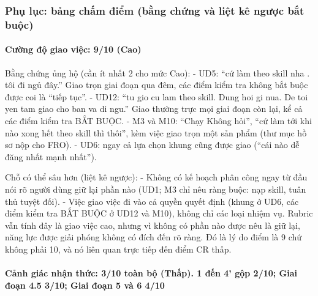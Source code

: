 \documentclass[12pt,a4paper]{article}
\begin{document}
\hypertarget{phux1ee5-lux1ee5c-bux1ea3ng-chux1ea5m-ux111iux1ec3m-bux1eb1ng-chux1ee9ng-vuxe0-liux1ec7t-kuxea-ngux1b0ux1ee3c-bux1eaft-buux1ed9c}{%
\subsubsection{Phụ lục: bảng chấm điểm (bằng chứng và liệt kê ngược bắt
buộc)}\label{phux1ee5-lux1ee5c-bux1ea3ng-chux1ea5m-ux111iux1ec3m-bux1eb1ng-chux1ee9ng-vuxe0-liux1ec7t-kuxea-ngux1b0ux1ee3c-bux1eaft-buux1ed9c}}

\hypertarget{cux1b0ux1eddng-ux111ux1ed9-giao-viux1ec7c-910-cao}{%
\paragraph{Cường độ giao việc: 9/10
(Cao)}\label{cux1b0ux1eddng-ux111ux1ed9-giao-viux1ec7c-910-cao}}

Bằng chứng ủng hộ (cần ít nhất 2 cho mức Cao): - UD5: ``cứ làm theo
skill nha . tôi đi ngủ đây.'' Giao trọn giai đoạn qua đêm, các điểm kiểm
tra không bắt buộc được coi là ``tiếp tục''. - UD12: ``tu gio cu lam
theo skill. Dung hoi gi nua. De toi yen tam giao cho ban va di ngu.''
Giao thường trực mọi giai đoạn còn lại, kể cả các điểm kiểm tra BẮT
BUỘC. - M3 và M10: ``Chạy Không hỏi'', ``cứ làm tới khi nào xong hết
theo skill thì thôi'', kèm việc giao trọn một sản phẩm (thư mục hồ sơ
nộp cho FRO). - UD6: ngay cả lựa chọn khung cũng được giao (``cái nào dễ
đăng nhất mạnh nhất'').

Chỗ có thể sâu hơn (liệt kê ngược): - Không có kế hoạch phân công ngay
từ đầu nói rõ người dùng giữ lại phần nào (UD1; M3 chỉ nêu ràng buộc:
nạp skill, tuân thủ tuyệt đối). - Việc giao việc đi vào cả quyền quyết
định (khung ở UD6, các điểm kiểm tra BẮT BUỘC ở UD12 và M10), không chỉ
các loại nhiệm vụ. Rubric vẫn tính đây là giao việc cao, nhưng vì không
có phần nào được nêu là giữ lại, năng lực được giải phóng không có đích
đến rõ ràng. Đó là lý do điểm là 9 chứ không phải 10, và nó liên quan
trực tiếp đến điểm CR thấp.

\hypertarget{cux1ea3nh-giuxe1c-nhux1eadn-thux1ee9c-310-touxe0n-bux1ed9-thux1ea5p.-1-ux111ux1ebfn-4-gux1ed9p-210-giai-ux111oux1ea1n-4.5-310-giai-ux111oux1ea1n-5-vuxe0-6-410}{%
\paragraph{Cảnh giác nhận thức: 3/10 toàn bộ (Thấp). 1 đến 4' gộp 2/10;
Giai đoạn 4.5 3/10; Giai đoạn 5 và 6
4/10}\label{cux1ea3nh-giuxe1c-nhux1eadn-thux1ee9c-310-touxe0n-bux1ed9-thux1ea5p.-1-ux111ux1ebfn-4-gux1ed9p-210-giai-ux111oux1ea1n-4.5-310-giai-ux111oux1ea1n-5-vuxe0-6-410}}
\end{document}
